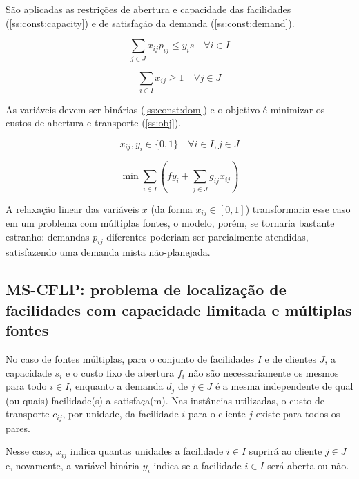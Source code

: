 \documentclass[]{article}
\begin{document}
	São aplicadas as restrições de abertura e capacidade das facilidades (\ref{ss:const:capacity}) e de satisfação da demanda (\ref{ss:const:demand}).
	
	\begin{equation}
		\label{ss:const:capacity}		
		\sum_{j \in J} x_{ij} p_{ij} \le y_i s 
		\quad
		\forall i \in I
	\end{equation}	

	\begin{equation}
		\label{ss:const:demand}		
		\sum_{i \in I} x_{ij} \ge 1 
		\quad
		\forall j \in J
	\end{equation}

	As variáveis devem ser binárias (\ref{ss:const:dom}) 
	e o objetivo é minimizar os custos de abertura e transporte (\ref{ss:obj}).
	
	\begin{equation}
		\label{ss:const:dom}		
		x_{ij}, y_i \in \{0, 1\}
		\quad
		\forall i \in I, j \in J
	\end{equation}	
	
	\begin{equation}
		\label{ss:obj}		
		\min \sum_{i \in I} 
		(
			f y_i + \sum_{j \in J} g_{ij} x_{ij}
		)
	\end{equation}

	A relaxação linear das variáveis $x$ (da forma $x_{ij} \in [0,1]$) transformaria esse caso em um problema com múltiplas fontes, 
	o modelo, porém, se tornaria bastante estranho:  
	demandas $p_{ij}$ diferentes poderiam ser parcialmente atendidas, satisfazendo uma demanda mista não-planejada.
	
\subsection{MS-CFLP: problema de localização de facilidades com capacidade limitada e múltiplas fontes}
	

 
	No caso de fontes múltiplas, para o conjunto de facilidades $I$ e de clientes $J$, 
	a capacidade $s_i$ e o custo fixo de abertura $f_i$ não são necessariamente os mesmos para todo $i \in I$, 
	enquanto a demanda $d_j$ de $j \in J$ é a mesma
	independente de qual (ou quais) facilidade(s) a satisfaça(m). 
	Nas instâncias utilizadas, o custo de transporte $c_{ij}$, por unidade, da facilidade $i$ para o cliente $j$ existe para todos os pares.
	
	Nesse caso, $x_{ij}$ indica quantas unidades a facilidade $i \in I$ suprirá ao cliente $j \in J$ 
	e, novamente, a variável binária $y_i$ indica se a facilidade $i \in I$ será aberta ou não.
\end{document}
